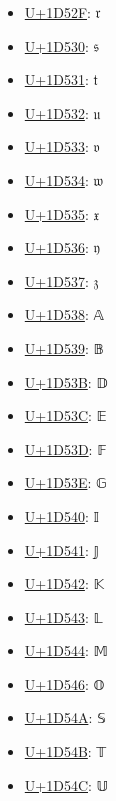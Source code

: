 \begin{itemize}
	\item \href{https://www.compart.com/en/unicode/U+1D52F}{U+1D52F}: 𝔯
	\item \href{https://www.compart.com/en/unicode/U+1D530}{U+1D530}: 𝔰
	\item \href{https://www.compart.com/en/unicode/U+1D531}{U+1D531}: 𝔱
	\item \href{https://www.compart.com/en/unicode/U+1D532}{U+1D532}: 𝔲
	\item \href{https://www.compart.com/en/unicode/U+1D533}{U+1D533}: 𝔳
	\item \href{https://www.compart.com/en/unicode/U+1D534}{U+1D534}: 𝔴
	\item \href{https://www.compart.com/en/unicode/U+1D535}{U+1D535}: 𝔵
	\item \href{https://www.compart.com/en/unicode/U+1D536}{U+1D536}: 𝔶
	\item \href{https://www.compart.com/en/unicode/U+1D537}{U+1D537}: 𝔷
	\item \href{https://www.compart.com/en/unicode/U+1D538}{U+1D538}: 𝔸
	\item \href{https://www.compart.com/en/unicode/U+1D539}{U+1D539}: 𝔹
	\item \href{https://www.compart.com/en/unicode/U+1D53B}{U+1D53B}: 𝔻
	\item \href{https://www.compart.com/en/unicode/U+1D53C}{U+1D53C}: 𝔼
	\item \href{https://www.compart.com/en/unicode/U+1D53D}{U+1D53D}: 𝔽
	\item \href{https://www.compart.com/en/unicode/U+1D53E}{U+1D53E}: 𝔾
	\item \href{https://www.compart.com/en/unicode/U+1D540}{U+1D540}: 𝕀
	\item \href{https://www.compart.com/en/unicode/U+1D541}{U+1D541}: 𝕁
	\item \href{https://www.compart.com/en/unicode/U+1D542}{U+1D542}: 𝕂
	\item \href{https://www.compart.com/en/unicode/U+1D543}{U+1D543}: 𝕃
	\item \href{https://www.compart.com/en/unicode/U+1D544}{U+1D544}: 𝕄
	\item \href{https://www.compart.com/en/unicode/U+1D546}{U+1D546}: 𝕆
	\item \href{https://www.compart.com/en/unicode/U+1D54A}{U+1D54A}: 𝕊
	\item \href{https://www.compart.com/en/unicode/U+1D54B}{U+1D54B}: 𝕋
	\item \href{https://www.compart.com/en/unicode/U+1D54C}{U+1D54C}: 𝕌

\end{itemize}
